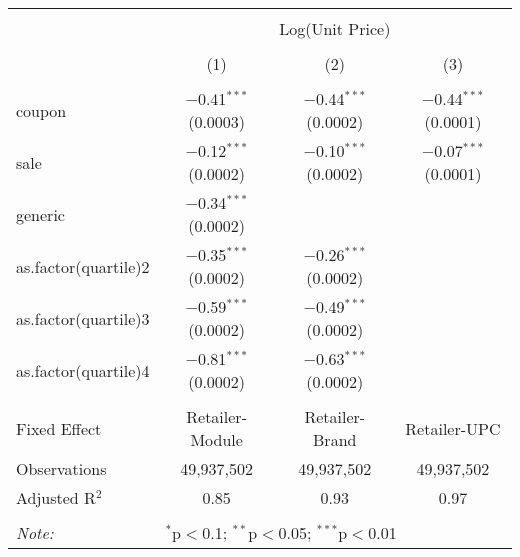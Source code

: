 
\begin{table}[!htbp] \centering 
  \caption{} 
  \label{tab:overallSavings} 
\begin{tabular}{@{\extracolsep{5pt}}lccc} 
\\[-1.8ex]\hline 
\hline \\[-1.8ex] 
 & \multicolumn{3}{c}{Log(Unit Price)} \\ 
\\[-1.8ex] & (1) & (2) & (3)\\ 
\hline \\[-1.8ex] 
 coupon & $-$0.41$^{***}$ (0.0003) & $-$0.44$^{***}$ (0.0002) & $-$0.44$^{***}$ (0.0001) \\ 
  sale & $-$0.12$^{***}$ (0.0002) & $-$0.10$^{***}$ (0.0002) & $-$0.07$^{***}$ (0.0001) \\ 
  generic & $-$0.34$^{***}$ (0.0002) &  &  \\ 
  as.factor(quartile)2 & $-$0.35$^{***}$ (0.0002) & $-$0.26$^{***}$ (0.0002) &  \\ 
  as.factor(quartile)3 & $-$0.59$^{***}$ (0.0002) & $-$0.49$^{***}$ (0.0002) &  \\ 
  as.factor(quartile)4 & $-$0.81$^{***}$ (0.0002) & $-$0.63$^{***}$ (0.0002) &  \\ 
 \hline \\[-1.8ex] 
Fixed Effect & Retailer-Module & Retailer-Brand & Retailer-UPC \\ 
Observations & 49,937,502 & 49,937,502 & 49,937,502 \\ 
Adjusted R$^{2}$ & 0.85 & 0.93 & 0.97 \\ 
\hline 
\hline \\[-1.8ex] 
\textit{Note:}  & \multicolumn{3}{l}{$^{*}$p$<$0.1; $^{**}$p$<$0.05; $^{***}$p$<$0.01} \\ 
\end{tabular} 
\end{table} 
